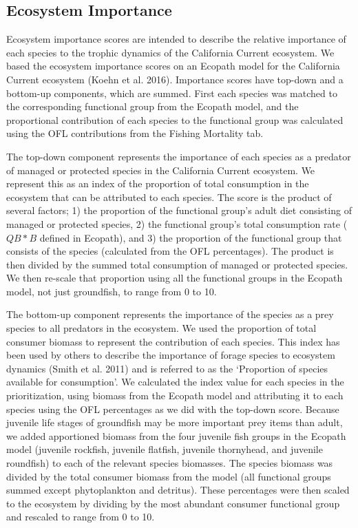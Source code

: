 \documentclass[11pt,
  english,
  a4paper,
]{article}
\begin{document}
\hypertarget{ecosystem-importance}{%
\subsection{Ecosystem Importance}\label{ecosystem-importance}}

Ecosystem importance scores are intended to describe the relative importance of each species to the trophic dynamics of the California Current ecosystem. We based the ecosystem importance scores on an Ecopath model for the California Current ecosystem (Koehn et al. 2016). Importance scores have top-down and a bottom-up components, which are summed. First each species was matched to the corresponding functional group from the Ecopath model, and the proportional contribution of each species to the functional group was calculated using the OFL contributions from the Fishing Mortality tab.

The top-down component represents the importance of each species as a predator of managed or protected species in the California Current ecosystem. We represent this as an index of the proportion of total consumption in the ecosystem that can be attributed to each species. The score is the product of several factors; 1) the proportion of the functional group's adult diet consisting of managed or protected species, 2) the functional group's total consumption rate (\(QB*B\) defined in Ecopath), and 3) the proportion of the functional group that consists of the species (calculated from the OFL percentages). The product is then divided by the summed total consumption of managed or protected species. We then re-scale that proportion using all the functional groups in the Ecopath model, not just groundfish, to range from 0 to 10.

The bottom-up component represents the importance of the species as a prey species to all predators in the ecosystem. We used the proportion of total consumer biomass to represent the contribution of each species. This index has been used by others to describe the importance of forage species to ecosystem dynamics (Smith et al. 2011) and is referred to as the `Proportion of species available for consumption'. We calculated the index value for each species in the prioritization, using biomass from the Ecopath model and attributing it to each species using the OFL percentages as we did with the top-down score. Because juvenile life stages of groundfish may be more important prey items than adult, we added apportioned biomass from the four juvenile fish groups in the Ecopath model (juvenile rockfish, juvenile flatfish, juvenile thornyhead, and juvenile roundfish) to each of the relevant species biomasses. The species biomass was divided by the total consumer biomass from the model (all functional groups summed except phytoplankton and detritus). These percentages were then scaled to the ecosystem by dividing by the most abundant consumer functional group and rescaled to range from 0 to 10.
\end{document}
